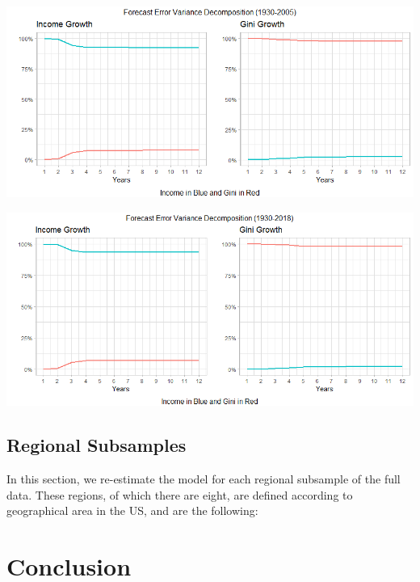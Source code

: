\documentclass[11pt,preprint, authoryear]{elsarticle}
\let\origfigure\figure
\let\endorigfigure\endfigure
\renewenvironment{figure}[1][2] {
    \expandafter\origfigure\expandafter[H]
} {
    \endorigfigure
}
\numberwithin{equation}{section}
\numberwithin{figure}{section}
\numberwithin{table}{section}
\begin{document}
\newpage

\begin{figure}[H]
\includegraphics[width=1\linewidth]{images/Fig5_fevd_rep} \caption{\label{Fig5}}\label{fig:Fig5}
\end{figure}

\begin{figure}[H]
\includegraphics[width=1\linewidth]{images/Fig6_fevd_full} \caption{\label{Fig6}}\label{fig:Fig6}
\end{figure}

\newpage

\hypertarget{regional-subsamples}{%
\subsection{\texorpdfstring{Regional Subsamples
\label{Section 3.4}}{Regional Subsamples }}\label{regional-subsamples}}

In this section, we re-estimate the model for each regional subsample of
the full data. These regions, of which there are eight, are defined
according to geographical area in the US, and are the following:

\hypertarget{conclusion}{%
\section{Conclusion}\label{conclusion}}
\end{document}
